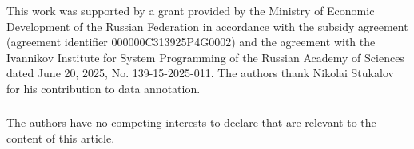 \documentclass[runningheads,a4paper]{llncs}
\begin{document}
\begin{credits}
\subsubsection{\ackname}
This work was supported by a grant provided by the Ministry of Economic
Development of the Russian Federation in accordance with the subsidy agreement
(agreement identifier 000000C313925P4G0002) and the agreement with the Ivannikov
Institute for System Programming of the Russian Academy of Sciences dated
June 20, 2025, No. 139-15-2025-011. The authors thank Nikolai Stukalov for his
contribution to data annotation.

\subsubsection{\discintname}
The authors have no competing interests to declare that are relevant to the
content of this article.
\end{credits}


\end{document}
